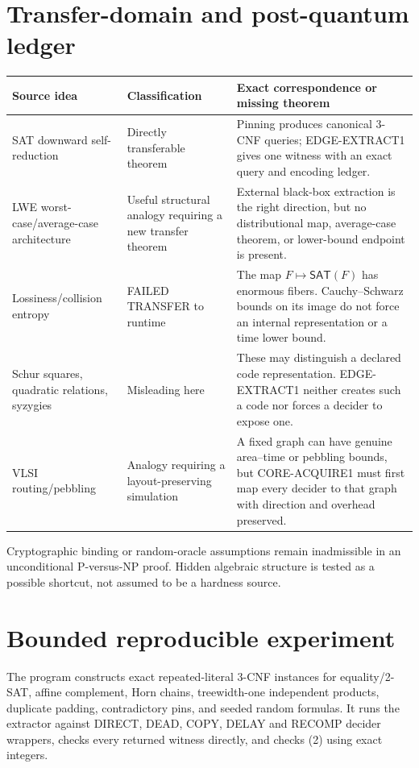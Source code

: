 \documentclass[11pt]{article}
\newcommand{\SAT}{\mathsf{SAT}}
\begin{document}
\section{Transfer-domain and post-quantum ledger}
\begin{longtable}{p{}p{}p{}}
\toprule Source idea&Classification&Exact correspondence or missing theorem\\\midrule\endhead
SAT downward self-reduction&Directly transferable theorem&Pinning produces
canonical 3-CNF queries; EDGE-EXTRACT1 gives one witness with an exact query
and encoding ledger.\\
LWE worst-case/average-case architecture&Useful structural analogy requiring
a new transfer theorem&External black-box extraction is the right direction,
but no distributional map, average-case theorem, or lower-bound endpoint is
present.\\
Lossiness/collision entropy&FAILED TRANSFER to runtime&The map
$F\mapsto\SAT(F)$ has enormous fibers.  Cauchy--Schwarz bounds on its image
do not force an internal representation or a time lower bound.\\
Schur squares, quadratic relations, syzygies&Misleading here&These may
distinguish a declared code representation.  EDGE-EXTRACT1 neither creates
such a code nor forces a decider to expose one.\\
VLSI routing/pebbling&Analogy requiring a layout-preserving simulation&A
fixed graph can have genuine area--time or pebbling bounds, but CORE-ACQUIRE1
must first map every decider to that graph with direction and overhead
preserved.\\
\bottomrule
\end{longtable}
Cryptographic binding or random-oracle assumptions remain inadmissible in an
unconditional P-versus-NP proof.  Hidden algebraic structure is tested as a
possible shortcut, not assumed to be a hardness source.

\section{Bounded reproducible experiment}
The program
 constructs exact
repeated-literal 3-CNF instances for equality/2-SAT, affine complement,
Horn chains, treewidth-one independent products, duplicate padding,
contradictory pins, and seeded random formulas.  It runs the extractor
against DIRECT, DEAD, COPY, DELAY and RECOMP decider wrappers, checks every
returned witness directly, and checks (2) using exact integers.
\end{document}
